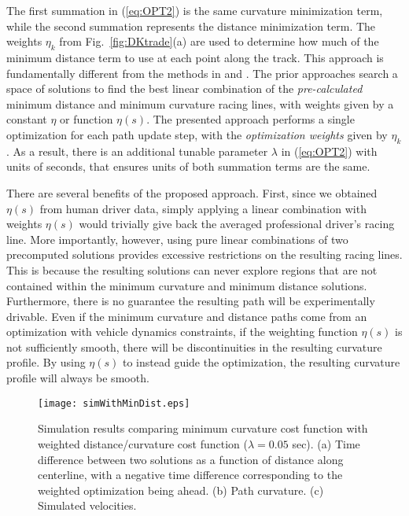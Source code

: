 The first summation in (\ref{eq:OPT2}) is the same curvature minimization term, while the second summation represents the distance minimization term. The weights
$\eta_k$ from Fig.~\ref{fig:DKtrade}(a) are used to determine how much of the minimum distance term to use at each point along the track. This approach is fundamentally
different from the methods in \cite{braghin} and \cite{cardamone}. The prior approaches search a space of solutions to find the best linear combination of the \textit{pre-calculated} minimum distance and minimum curvature racing
lines, with weights given by a constant $\eta$ or function $\eta(s)$. The presented approach performs a single optimization for each path update step, with the \textit{optimization weights} given by $\eta_k$. As a result, there is 
an additional tunable parameter $\lambda$ in (\ref{eq:OPT2}) with units of seconds, that ensures units of both summation terms are the same.

There are several benefits of the proposed approach. First, since we obtained $\eta(s)$ from human driver data, simply applying a linear combination with weights $\eta(s)$ would
trivially give back the averaged professional driver's racing line. More importantly, however, using pure linear combinations of two precomputed solutions provides excessive restrictions on the resulting racing lines. 
This is because the resulting solutions can never explore regions that are not contained within the minimum curvature and minimum distance solutions. Furthermore, there is no guarantee the resulting path will be experimentally drivable. 
Even if the minimum curvature and distance paths come from an optimization with vehicle dynamics constraints, if the weighting function $\eta(s)$ is not sufficiently smooth, there will be discontinuities in
the resulting curvature profile. By using $\eta(s)$ to instead guide the optimization, the resulting curvature profile will always be smooth. 


 \begin{figure}
\centering
\texttt{[image: simWithMinDist.eps]}
\caption[Simulation results comparing minimum curvature cost function with weighted cost function]{Simulation results comparing minimum curvature cost function with weighted distance/curvature cost function ($\lambda = 0.05$ sec). (a) Time difference between two solutions as a function
of distance along centerline, with a negative time
difference corresponding to the weighted optimization being ahead. (b) Path curvature. (c) Simulated velocities.}
\label{fig:SD2}
\end{figure}

